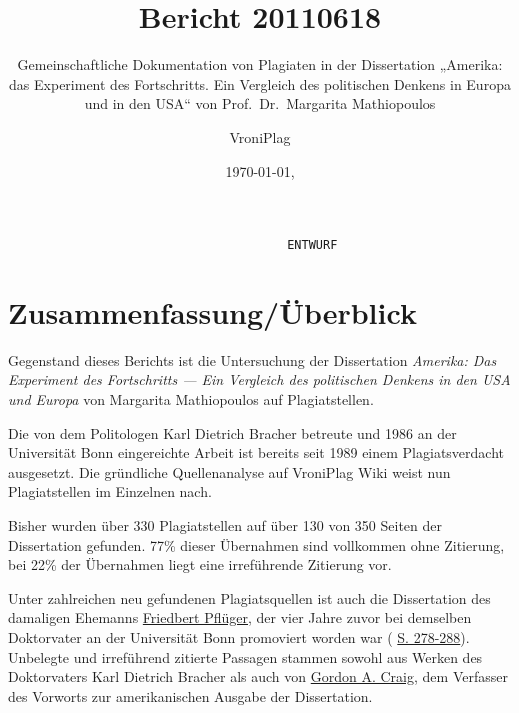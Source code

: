 \documentclass[ngerman,final,fontsize=12pt,paper=a4,twoside,bibliography=totoc,BCOR=8mm,draft=false]{scrartcl}
\author{VroniPlag}
\title{Bericht 20110618}
\subtitle{Gemeinschaftliche Dokumentation von Plagiaten in der Dissertation „Amerika: das Experiment des Fortschritts. Ein Vergleich des politischen Denkens in Europa und in den USA“ von Prof.~Dr.~Margarita Mathiopoulos}
\date{\today, \thistime}
\newcommand{\BackgroundPic}
        {\put(0,0){\parbox[b][\paperheight]{\paperwidth}{%
                \vfill%
                \centering%
                \texttt{[image: background.png]}%
                \vfill%
        }}}
\begin{document}
\maketitle\thispagestyle{empty}

\tableofcontents

\begin{verbatim}
                                       ENTWURF
\end{verbatim}
\section{%
Zusammenfassung/Überblick}

Gegenstand dieses Berichts ist die Untersuchung der Dissertation %
\textit{Amerika: Das Experiment des Fortschritts --- Ein Vergleich des politischen Denkens in den USA und Europa} von Margarita Mathiopoulos auf Plagiatstellen. 


Die von dem Politologen Karl Dietrich Bracher betreute und 1986 an der Universität Bonn eingereichte Arbeit ist bereits seit 1989 einem Plagiatsverdacht ausgesetzt. Die gründliche Quellenanalyse auf VroniPlag Wiki weist nun Plagiatstellen im Einzelnen nach. 


Bisher wurden über 330 Plagiatstellen auf über 130 von 350 Seiten der Dissertation gefunden. 77\% dieser Übernahmen sind vollkommen ohne Zitierung, bei 22\% der Übernahmen liegt eine irreführende Zitierung vor. 


Unter zahlreichen neu gefundenen Plagiatsquellen ist auch die Dissertation des damaligen Ehemanns %
\href{http://de.vroniplag.wikia.com/wiki/Kategorie:Pfl\%C3\%BCger_1983}{Friedbert Pflüger}, der vier Jahre zuvor bei demselben Doktorvater an der Universität Bonn promoviert worden war (%
\href{http://de.vroniplag.wikia.com/wiki/Mm/Mathiopoulos-1987/278}{S. 278-288}). Unbelegte und irreführend zitierte Passagen stammen sowohl aus Werken des Doktorvaters Karl Dietrich Bracher als auch von %
\href{http://de.vroniplag.wikia.com/wiki/Kategorie:Craig_1984}{Gordon A. Craig}, dem Verfasser des Vorworts zur amerikanischen Ausgabe der Dissertation. 
\end{document}
